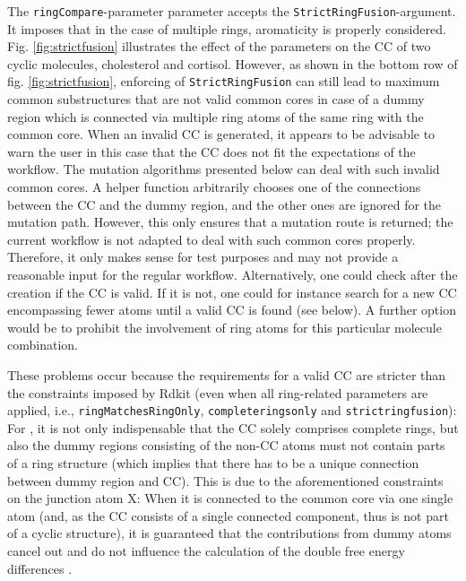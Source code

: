The \texttt{ringCompare}-parameter parameter accepts the \texttt{StrictRingFusion}-argument.
It imposes that in the case of multiple rings, aromaticity is properly
considered. Fig. \ref{fig:strictfusion} illustrates the effect of the parameters
on the CC of two cyclic molecules, cholesterol and cortisol. However, as shown in the bottom row of fig. \ref{fig:strictfusion}, enforcing
of \texttt{StrictRingFusion} can still lead to maximum common substructures
that are not valid {\trafo} common cores in case of a dummy region
which is connected via multiple ring atoms of the same ring with the common
core. 
When an invalid CC is generated, it appears to be advisable to warn the user in this case that the CC does not fit the expectations of the {\trafo} workflow. 
The mutation algorithms presented below can deal with such invalid common cores. A helper function arbitrarily chooses one of the connections between the CC and the dummy region, and the other ones are ignored for the mutation path. However, this only ensures that a mutation route is returned; the current {\trafo} workflow is not adapted to deal with such common cores properly. Therefore, it only makes sense for test purposes and may not provide a reasonable input for the regular workflow.
Alternatively, one could check after the creation if the CC is valid. If
it is not, one could for instance search for a new CC encompassing fewer
atoms until a valid CC is found (see below). A further option would be to prohibit the involvement of ring atoms for this particular molecule combination.

These problems occur because the requirements for a valid {\trafo} CC are stricter than the constraints imposed by Rdkit  (even when all ring-related parameters are applied, i.e., \texttt{ringMatchesRingOnly}, \texttt{completeringsonly} and \texttt{strictringfusion}): For {\trafo}, it is not only indispensable that the CC solely comprises complete rings, but also the dummy regions consisting of the non-CC atoms must not contain parts of a ring structure (which implies that there has to be a unique connection between dummy region and CC). This is due to the aforementioned constraints on the junction atom X: When it is connected to the common core via one single atom (and, as the CC consists of a single connected component, thus is not part of a cyclic structure), it is guaranteed that the contributions from dummy atoms cancel out and do not influence the calculation of the double free energy differences \cite{Karwounopoulos.2022}.

